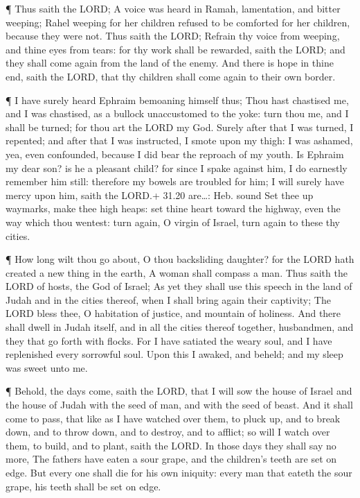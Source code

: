  ¶ Thus saith the LORD; A voice was heard in Ramah,
lamentation, and bitter weeping; Rahel weeping for her children refused
to be comforted for her children, because they were not. 
Thus saith the LORD; Refrain thy voice from weeping, and thine eyes from
tears: for thy work shall be rewarded, saith the LORD; and they shall
come again from the land of the enemy.  And there is hope
in thine end, saith the LORD, that thy children shall come again to
their own border.

 ¶ I have surely heard Ephraim bemoaning himself thus; Thou
hast chastised me, and I was chastised, as a bullock unaccustomed to the
yoke: turn thou me, and I shall be turned; for thou art the LORD my God.
 Surely after that I was turned, I repented; and after that
I was instructed, I smote upon my thigh: I was ashamed, yea, even
confounded, because I did bear the reproach of my youth. 
Is Ephraim my dear son? is he a pleasant child? for since I spake
against him, I do earnestly remember him still: therefore my bowels are
troubled for him; I will surely have mercy upon him, saith the LORD.+
31.20 are\ldots: Heb. sound  Set thee up waymarks, make
thee high heaps: set thine heart toward the highway, even the way which
thou wentest: turn again, O virgin of Israel, turn again to these thy
cities.

 ¶ How long wilt thou go about, O thou backsliding
daughter? for the LORD hath created a new thing in the earth, A woman
shall compass a man.  Thus saith the LORD of hosts, the God
of Israel; As yet they shall use this speech in the land of Judah and in
the cities thereof, when I shall bring again their captivity; The LORD
bless thee, O habitation of justice, and mountain of holiness.
 And there shall dwell in Judah itself, and in all the
cities thereof together, husbandmen, and they that go forth with flocks.
 For I have satiated the weary soul, and I have replenished
every sorrowful soul.  Upon this I awaked, and beheld; and
my sleep was sweet unto me.

 ¶ Behold, the days come, saith the LORD, that I will sow
the house of Israel and the house of Judah with the seed of man, and
with the seed of beast.  And it shall come to pass, that
like as I have watched over them, to pluck up, and to break down, and to
throw down, and to destroy, and to afflict; so will I watch over them,
to build, and to plant, saith the LORD.  In those days they
shall say no more, The fathers have eaten a sour grape, and the
children's teeth are set on edge.  But every one shall die
for his own iniquity: every man that eateth the sour grape, his teeth
shall be set on edge.

